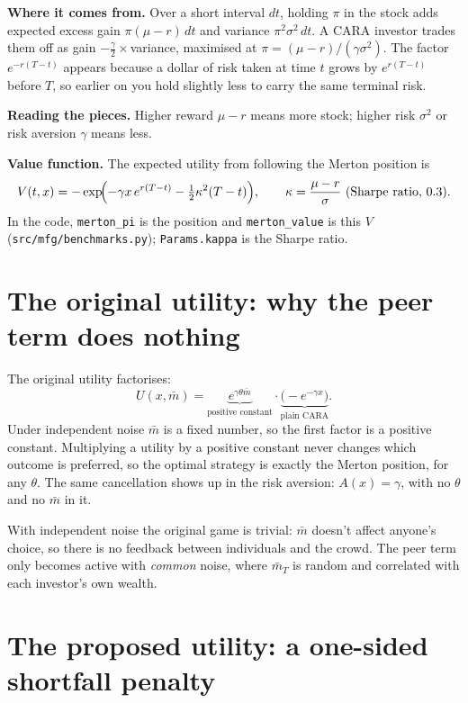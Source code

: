 \documentclass[11pt]{article}
\newcommand{\mb}{\bar m}
\begin{document}
\textbf{Where it comes from.} Over a short interval $dt$, holding $\pi$ in the stock adds
expected excess gain $\pi(\mu-r)\,dt$ and variance $\pi^2\sigma^2\,dt$. A CARA investor
trades them off as gain $-\tfrac{\gamma}{2}\times$variance, maximised at
$\pi=(\mu-r)/(\gamma\sigma^2)$. The factor $e^{-r(T-t)}$ appears because a dollar of risk
taken at time $t$ grows by $e^{r(T-t)}$ before $T$, so earlier on you hold slightly less to
carry the same terminal risk.

\textbf{Reading the pieces.} Higher reward $\mu-r$ means more stock; higher risk $\sigma^2$
or risk aversion $\gamma$ means less.

\textbf{Value function.} The expected utility from following the Merton position is
\[
  V(t,x) = -\exp\!\Bigl(-\gamma x\,e^{r(T-t)} - \tfrac12\kappa^2(T-t)\Bigr),
  \qquad \kappa = \frac{\mu-r}{\sigma}\ \text{(Sharpe ratio, $0.3$)} .
\]
In the code, \texttt{merton\_pi} is the position and \texttt{merton\_value} is this $V$
(\texttt{src/mfg/benchmarks.py}); \texttt{Params.kappa} is the Sharpe ratio.

\section{The original utility: why the peer term does nothing}\label{sec:original}

The original utility factorises:
\[
  U(x,\mb) = \underbrace{e^{\gamma\theta\mb}}_{\text{positive constant}}
             \cdot\underbrace{\bigl(-e^{-\gamma x}\bigr)}_{\text{plain CARA}} .
\]
Under independent noise $\mb$ is a fixed number, so the first factor is a positive
constant. Multiplying a utility by a positive constant never changes which outcome is
preferred, so the optimal strategy is exactly the Merton position, for any $\theta$. The
same cancellation shows up in the risk aversion: $A(x)=\gamma$, with no $\theta$ and no
$\mb$ in it.

\begin{keyidea}[Consequence]
With independent noise the original game is trivial: $\mb$ doesn't affect anyone's choice,
so there is no feedback between individuals and the crowd. The peer term only becomes
active with \emph{common} noise, where $\mb_T$ is random and correlated with each
investor's own wealth.
\end{keyidea}

\section{The proposed utility: a one-sided shortfall penalty}
\end{document}
